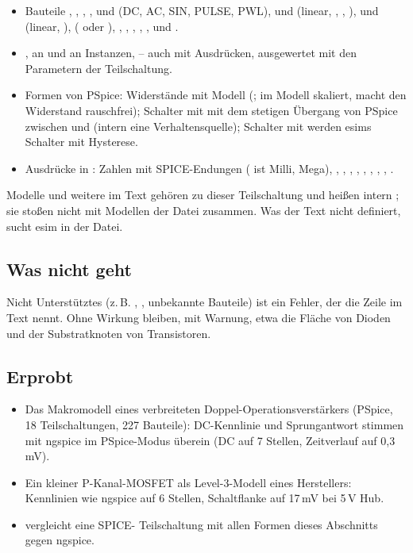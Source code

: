 \begin{itemize}
  \item Bauteile , , , ,  und
     (DC, AC, SIN, PULSE, PWL),  und  (linear,
    , , ),
     und  (linear, ),  (
    oder ), , , , , ,
     und .
  \item {},  an  und an Instanzen,
     – auch mit Ausdrücken, ausgewertet mit den Parametern der
    Teilschaltung.
  \item Formen von PSpice: Widerstände mit Modell (;
     im Modell skaliert,  macht den Widerstand
    rauschfrei); Schalter mit  mit dem
    stetigen Übergang von PSpice zwischen  und 
    (intern eine Verhaltensquelle); Schalter mit  werden
    esims Schalter mit Hysterese.
  \item Ausdrücke in : Zahlen mit SPICE-Endungen ( ist
    Milli,  Mega), \code{**}, , ,
    , , , , ,
    .
\end{itemize}

Modelle und weitere  im Text gehören zu dieser
Teilschaltung und heißen intern ; sie stoßen nicht mit
Modellen der Datei zusammen. Was der Text nicht definiert, sucht esim in
der Datei.

\subsection*{Was nicht geht}

Nicht Unterstütztes (z.\,B. , , unbekannte
Bauteile) ist ein Fehler, der die Zeile im Text nennt. Ohne Wirkung
bleiben, mit Warnung, etwa die Fläche von Dioden und der Substratknoten
von Transistoren.

\subsection*{Erprobt}

\begin{itemize}
  \item Das Makromodell eines verbreiteten Doppel-Operationsverstärkers
    (PSpice, 18 Teilschaltungen, 227 Bauteile): DC-Kennlinie und
    Sprungantwort stimmen mit ngspice im PSpice-Modus überein (DC auf 7
    Stellen, Zeitverlauf auf 0,3\,mV).
  \item Ein kleiner P-Kanal-MOSFET als Level-3-Modell eines Herstellers:
    Kennlinien wie ngspice auf 6 Stellen, Schaltflanke auf 17\,mV bei 5\,V
    Hub.
  \item {} vergleicht eine SPICE-
    Teilschaltung mit allen Formen dieses Abschnitts gegen ngspice.
\end{itemize}
